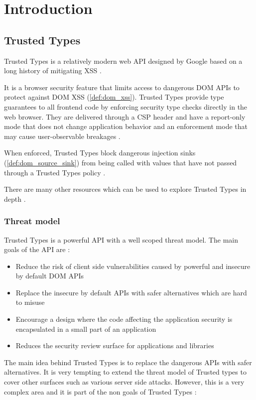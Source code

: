 \chapter{Introduction}

\section{Trusted Types}

Trusted Types is a relatively modern web API designed by Google based on a long history of
mitigating XSS \cite{tt_design_history}.

It is a browser security feature that limits access to dangerous DOM APIs to protect against DOM XSS
(\ref{def:dom_xss}). Trusted Types provide type guarantees to all frontend code by enforcing
security type checks directly in the web browser. They are delivered through a CSP header and have a
report-only mode that does not change application behavior and an enforcement mode that may cause
user-observable breakages \cite{tt_background}.

When enforced, Trusted Types block dangerous injection sinks (\ref{def:dom_source_sink}) from being
called with values that have not passed through a Trusted Types policy \cite{tt_background}.

There are many other resources which can be used to explore Trusted Types in depth
\cite{tt_resources}.

\subsection{Threat model}

Trusted Types is a powerful API with a well scoped threat model. The main goals of the API are
\cite{tt_spec:goals}:

\begin{itemize}
  \item Reduce the risk of client side vulnerabilities caused by powerful and insecure by default
        DOM APIs
  \item Replace the insecure by default APIs with safer alternatives which are hard to misuse
  \item Encourage a design where the code affecting the application security is encapsulated in a
        small part of an application
  \item Reduces the security review surface for applications and libraries
\end{itemize}

The main idea behind Trusted Types is to replace the dangerous APIs with safer alternatives. It is
very tempting to extend the threat model of Trusted types to cover other surfaces such as various
server side attacks. However, this is a very complex area and it is part of the non goals of Trusted
Types \cite{tt_spec:non_goals}:

